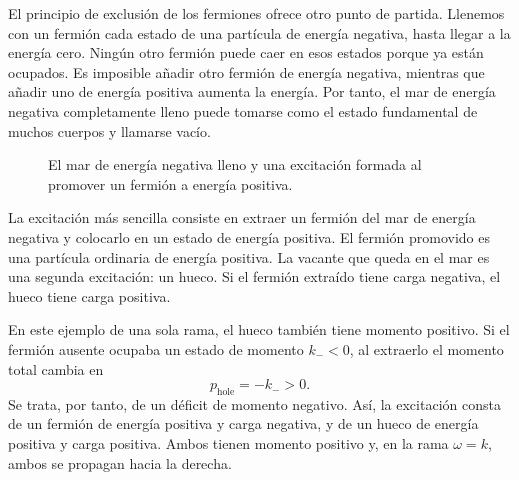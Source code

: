 El principio de exclusión de los fermiones ofrece otro punto de partida. Llenemos con un fermión cada estado de una partícula de energía negativa, hasta llegar a la energía cero. Ningún otro fermión puede caer en esos estados porque ya están ocupados. Es imposible añadir otro fermión de energía negativa, mientras que añadir uno de energía positiva aumenta la energía. Por tanto, el mar de energía negativa completamente lleno puede tomarse como el estado fundamental de muchos cuerpos y llamarse vacío.

\begin{figure}
\centering
{}
\caption{El mar de energía negativa lleno y una excitación formada al promover un fermión a energía positiva.}
\end{figure}

La excitación más sencilla consiste en extraer un fermión del mar de energía negativa y colocarlo en un estado de energía positiva. El fermión promovido es una partícula ordinaria de energía positiva. La vacante que queda en el mar es una segunda excitación: un hueco. Si el fermión extraído tiene carga negativa, el hueco tiene carga positiva.

En este ejemplo de una sola rama, el hueco también tiene momento positivo. Si el fermión ausente ocupaba un estado de momento \(k_-<0\), al extraerlo el momento total cambia en
\begin{equation}
p_{\mathrm{hole}}=-k_->0.
\end{equation}
Se trata, por tanto, de un déficit de momento negativo. Así, la excitación consta de un fermión de energía positiva y carga negativa, y de un hueco de energía positiva y carga positiva. Ambos tienen momento positivo y, en la rama \(\omega=k\), ambos se propagan hacia la derecha.

